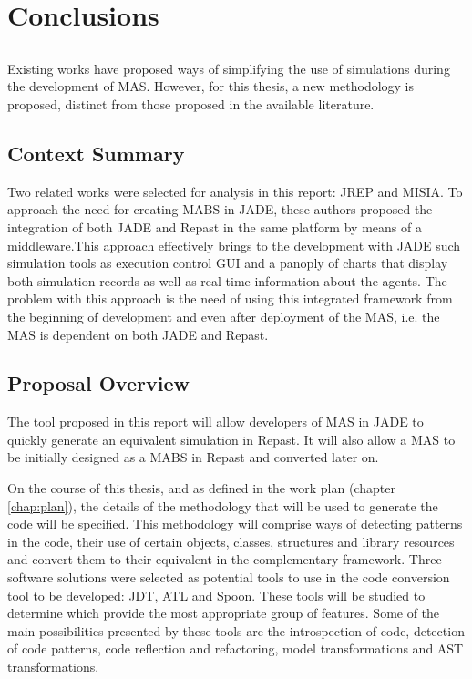 \chapter{Conclusions} \label{chap:concl}

\section*{}

Existing works have proposed ways of simplifying the use of simulations during the development of MAS. However, for this thesis, a new methodology is proposed, distinct from those proposed in the available literature.

\section{Context Summary}
Two related works were selected for analysis in this report: JREP and MISIA. To approach the need for creating MABS in JADE, these authors proposed the integration of both JADE and Repast in the same platform by means of a middleware.This approach effectively brings to the development with JADE such simulation tools as execution control GUI and a panoply of charts that display both simulation records as well as real-time information about the agents. The problem with this approach is the need of using this integrated framework from the beginning of development and even after deployment of the MAS, i.e. the MAS is dependent on both JADE and Repast.

\section{Proposal Overview}
The tool proposed in this report will allow developers of MAS in JADE to quickly generate an equivalent simulation in Repast. It will also allow a MAS to be initially designed as a MABS in Repast and converted later on.

On the course of this thesis, and as defined in the work plan (chapter \ref{chap:plan}), the details of the methodology that will be used to generate the code will be specified. This methodology will comprise ways of detecting patterns in the code, their use of certain objects, classes, structures and library resources and convert them to their equivalent in the complementary framework. Three software solutions were selected as potential tools to use in the code conversion tool to be developed: JDT, ATL and Spoon. These tools will be studied to determine which provide the most appropriate group of features. Some of the main possibilities presented by these tools are the introspection of code, detection of code patterns, code reflection and refactoring, model transformations and AST transformations.







